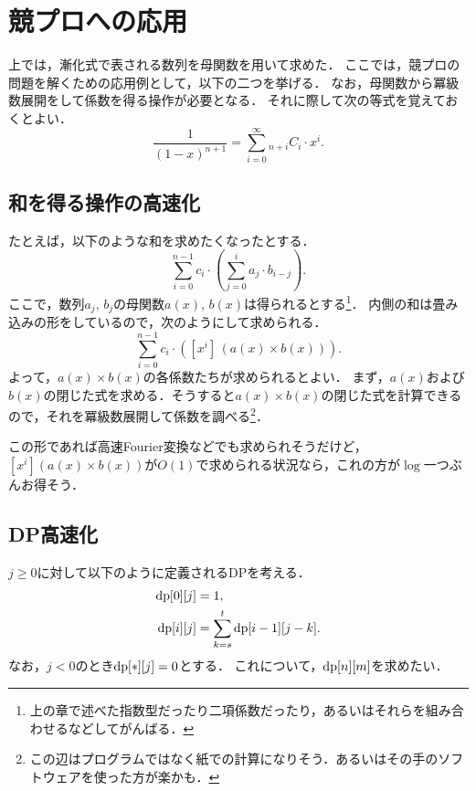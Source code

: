 \documentclass{jsarticle}
\newcommand{\DP}{\ensuremath\mathrm{dp}}
\begin{document}
\section{競プロへの応用}
上では，漸化式で表される数列を母関数を用いて求めた．
ここでは，競プロの問題を解くための応用例として，以下の二つを挙げる．
なお，母関数から冪級数展開をして係数を得る操作が必要となる．
それに際して次の等式を覚えておくとよい．
\[
\frac{1}{(1-x)^{n+1}} = \sum_{i=0}^\infty {}_{n+i}C_i\cdot x^i.
\]

\subsection{和を得る操作の高速化}
たとえば，以下のような和を求めたくなったとする．
\[\sum_{i=0}^{n-1} c_i\cdot\left(\sum_{j=0}^i a_j\cdot b_{i-j}\right).\]
ここで，数列$a_j$, $b_j$の母関数$a(x)$, $b(x)$は得られるとする\footnote{上の章で述べた指数型だったり二項係数だったり，あるいはそれらを組み合わせるなどしてがんばる．}．
内側の和は畳み込みの形をしているので，次のようにして求められる．
\[\sum_{i=0}^{n-1} c_i\cdot\left([x^i]\,(a(x)\times b(x))\right).\]
よって，$a(x)\times b(x)$の各係数たちが求められるとよい．
まず，$a(x)$および$b(x)$の閉じた式を求める．そうすると$a(x)\times b(x)$の閉じた式を計算できるので，それを冪級数展開して係数を調べる\footnote{この辺はプログラムではなく紙での計算になりそう．あるいはその手のソフトウェアを使った方が楽かも．}．

この形であれば高速Fourier変換などでも求められそうだけど，$[x^i] (a(x)\times b(x))$が$O(1)$で求められる状況なら，これの方が$\log$一つぶんお得そう．

\subsection{DP高速化}
$j \ge 0$に対して以下のように定義されるDPを考える．
\begin{align*}
  \DP[0][j] &= 1,\\
  \DP[i][j] &= \sum_{k=s}^t \DP[i-1][j-k].
\end{align*}
なお，$j < 0$のとき$\DP[*][j] = 0$とする．
これについて，$\DP[n][m]$を求めたい．
\end{document}
